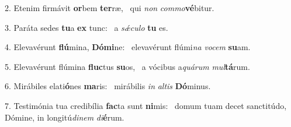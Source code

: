 2. Etenim firmávit \textbf{or}bem \textbf{ter}ræ, \ast\  qui \textit{non} \textit{com}\textit{mo}\textbf{vé}bitur.\

3. Paráta sedes \textbf{tu}a \textbf{ex} tunc: \ast\  a \textit{sǽ}\textit{cu}\textit{lo} \textbf{tu} es.\

4. Elevavérunt \textbf{flú}mina, \textbf{Dó}\textbf{mi}ne: \ast\  elevavérunt flúmi\textit{na} \textit{vo}\textit{cem} \textbf{su}am.\

5. Elevavérunt flúmina \textbf{fluc}tus \textbf{su}os, \ast\  a vócibus a\textit{quá}\textit{rum} \textit{mul}\textbf{tá}rum.\

6. Mirábiles elati\textbf{ó}nes \textbf{ma}ris: \ast\  mirábilis \textit{in} \textit{al}\textit{tis} \textbf{Dó}minus.\

7. Testimónia tua credibília \textbf{fac}ta sunt \textbf{ni}mis: \ast\  domum tuam decet sanctitúdo, Dómine, in longitú\textit{di}\textit{nem} \textit{di}\textbf{é}rum.\

